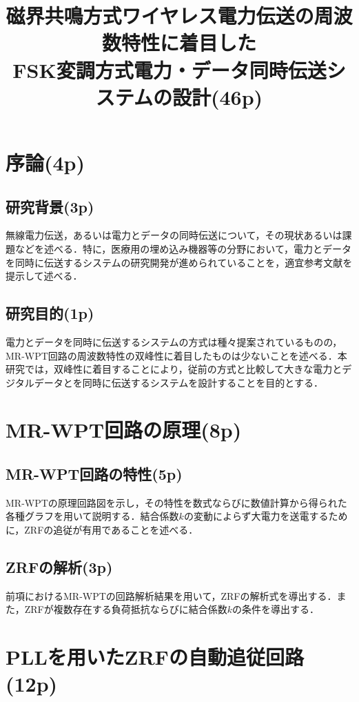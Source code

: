 \documentclass{jsarticle}
\title{\vspace{-3cm}磁界共鳴方式ワイヤレス電力伝送の周波数特性に着目した \\ FSK変調方式電力・データ同時伝送システムの設計(46p)}
\date{\empty}
\begin{document}
\maketitle 
\vspace{-2cm}

\section{序論(4p)}
\subsection{研究背景(3p)}
無線電力伝送，あるいは電力とデータの同時伝送について，その現状あるいは課題などを述べる．特に，医療用の埋め込み機器等の分野において，電力とデータを同時に伝送するシステムの研究開発が進められていることを，適宜参考文献を提示して述べる．

\subsection{研究目的(1p)}
電力とデータを同時に伝送するシステムの方式は種々提案されているものの，MR-WPT回路の周波数特性の双峰性に着目したものは少ないことを述べる．本研究では，双峰性に着目することにより，従前の方式と比較して大きな電力とデジタルデータとを同時に伝送するシステムを設計することを目的とする．

\section{MR-WPT回路の原理(8p)}
\subsection{MR-WPT回路の特性(5p)}
MR-WPTの原理回路図を示し，その特性を数式ならびに数値計算から得られた各種グラフを用いて説明する．結合係数$k$の変動によらず大電力を送電するために，ZRFの追従が有用であることを述べる．

\subsection{ZRFの解析(3p)}
前項におけるMR-WPTの回路解析結果を用いて，ZRFの解析式を導出する．また，ZRFが複数存在する負荷抵抗ならびに結合係数$k$の条件を導出する．

\section{PLLを用いたZRFの自動追従回路(12p)}
\end{document}
